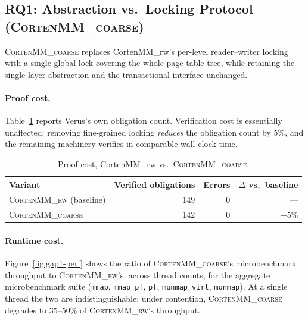 \documentclass[10pt]{article}
\newcommand{\corten}[1]{\textsc{CortenMM\_#1}}
\begin{document}
\subsection{RQ1: Abstraction vs.\ Locking Protocol (\corten{coarse})}
\label{sec:eval:gap1}

\corten{coarse} replaces CortenMM\_rw's per-level reader--writer locking
with a single global lock covering the whole page-table tree, while
retaining the single-layer abstraction and the transactional interface
unchanged.

\paragraph{Proof cost.} Table~\ref{tab:gap1-proof} reports Verus's own
obligation count. Verification cost is essentially unaffected: removing
fine-grained locking \emph{reduces} the obligation count by 5\%, and the
remaining machinery verifies in comparable wall-clock time.

\begin{table}[h]
\centering
\caption{Proof cost, CortenMM\_rw vs.\ \corten{coarse}.}
\label{tab:gap1-proof}
\begin{tabular}{@{}lrrr@{}}
\toprule
Variant & Verified obligations & Errors & $\Delta$ vs.\ baseline \\
\midrule
\corten{rw} (baseline)   & 149 & 0 & --- \\
\corten{coarse}          & 142 & 0 & $-5\%$ \\
\bottomrule
\end{tabular}
\end{table}

\paragraph{Runtime cost.} Figure~\ref{fig:gap1-perf} shows the ratio of
\corten{coarse}'s microbenchmark throughput to \corten{rw}'s, across
thread counts, for the aggregate microbenchmark suite (\texttt{mmap},
\texttt{mmap\_pf}, \texttt{pf}, \texttt{munmap\_virt}, \texttt{munmap}).
At a single thread the two are indistinguishable; under contention,
\corten{coarse} degrades to 35--50\% of \corten{rw}'s throughput.
\end{document}
